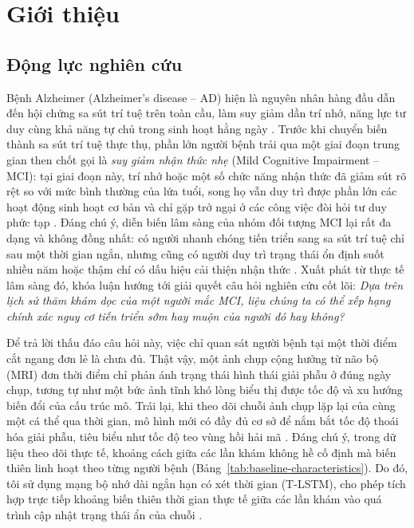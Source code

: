 \chapter{Giới thiệu}
\label{chap:intro}

\section{Động lực nghiên cứu}
Bệnh Alzheimer (Alzheimer's disease -- AD) hiện là nguyên nhân hàng đầu dẫn đến hội chứng sa sút trí tuệ trên toàn cầu, làm suy giảm dần trí nhớ, năng lực tư duy cùng khả năng tự chủ trong sinh hoạt hằng ngày \cite{cdc2024alzheimers}. Trước khi chuyển biến thành sa sút trí tuệ thực thụ, phần lớn người bệnh trải qua một giai đoạn trung gian then chốt gọi là \emph{suy giảm nhận thức nhẹ} (Mild Cognitive Impairment -- MCI): tại giai đoạn này, trí nhớ hoặc một số chức năng nhận thức đã giảm sút rõ rệt so với mức bình thường của lứa tuổi, song họ vẫn duy trì được phần lớn các hoạt động sinh hoạt cơ bản và chỉ gặp trở ngại ở các công việc đòi hỏi tư duy phức tạp \cite{jack2018niaaa}. Đáng chú ý, diễn biến lâm sàng của nhóm đối tượng MCI lại rất đa dạng và không đồng nhất: có người nhanh chóng tiến triển sang sa sút trí tuệ chỉ sau một thời gian ngắn, nhưng cũng có người duy trì trạng thái ổn định suốt nhiều năm hoặc thậm chí có dấu hiệu cải thiện nhận thức \cite{petersen2018mci}. Xuất phát từ thực tế lâm sàng đó, khóa luận hướng tới giải quyết câu hỏi nghiên cứu cốt lõi: \emph{Dựa trên lịch sử thăm khám dọc của một người mắc MCI, liệu chúng ta có thể xếp hạng chính xác nguy cơ tiến triển sớm hay muộn của người đó hay không?}

Để trả lời thấu đáo câu hỏi này, việc chỉ quan sát người bệnh tại một thời điểm cắt ngang đơn lẻ là chưa đủ. Thật vậy, một ảnh chụp cộng hưởng từ não bộ (MRI) đơn thời điểm chỉ phản ánh trạng thái hình thái giải phẫu ở đúng ngày chụp, tương tự như một bức ảnh tĩnh khó lòng biểu thị được tốc độ và xu hướng biến đổi của cấu trúc mô. Trái lại, khi theo dõi chuỗi ảnh chụp lặp lại của cùng một cá thể qua thời gian, mô hình mới có đầy đủ cơ sở để nắm bắt tốc độ thoái hóa giải phẫu, tiêu biểu như tốc độ teo vùng hồi hải mã \cite{dong2021deepatrophy}. Đáng chú ý, trong dữ liệu theo dõi thực tế, khoảng cách giữa các lần khám không hề cố định mà biến thiên linh hoạt theo từng người bệnh (Bảng~\ref{tab:baseline-characteristics}). Do đó, tôi sử dụng mạng bộ nhớ dài ngắn hạn có xét thời gian (T-LSTM), cho phép tích hợp trực tiếp khoảng biến thiên thời gian thực tế giữa các lần khám vào quá trình cập nhật trạng thái ẩn của chuỗi \cite{baytas2017patient}.

